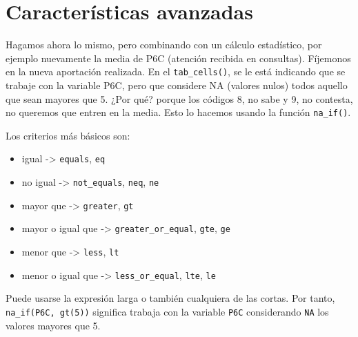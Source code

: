 \documentclass[
]{book}
\providecommand{\tightlist}{%
  \setlength{\itemsep}{0pt}\setlength{\parskip}{0pt}}
\begin{document}
\hypertarget{caracteruxedsticas-avanzadas}{%
\section{Características avanzadas}\label{caracteruxedsticas-avanzadas}}

Hagamos ahora lo mismo, pero combinando con un cálculo estadístico, por ejemplo nuevamente la media de P6C (atención recibida en consultas). Fíjemonos en la nueva aportación realizada. En el \texttt{tab\_cells()}, se le está indicando que se trabaje con la variable P6C, pero que considere NA (valores nulos) todos aquello que sean mayores que 5. ¿Por qué? porque los códigos 8, no sabe y 9, no contesta, no queremos que entren en la media. Esto lo hacemos usando la función \texttt{na\_if()}.

Los criterios más básicos son:

\begin{itemize}
\tightlist
\item
  igual -\textgreater{} \texttt{equals}, \texttt{eq}
\item
  no igual -\textgreater{} \texttt{not\_equals}, \texttt{neq}, \texttt{ne}
\item
  mayor que -\textgreater{} \texttt{greater}, \texttt{gt}
\item
  mayor o igual que -\textgreater{} \texttt{greater\_or\_equal}, \texttt{gte}, \texttt{ge}
\item
  menor que -\textgreater{} \texttt{less}, \texttt{lt}
\item
  menor o igual que -\textgreater{} \texttt{less\_or\_equal}, \texttt{lte}, \texttt{le}
\end{itemize}

Puede usarse la expresión larga o también cualquiera de las cortas. Por tanto, \texttt{na\_if(P6C,\ gt(5))} significa trabaja con la variable \texttt{P6C} considerando \texttt{NA} los valores mayores que 5.
\end{document}

